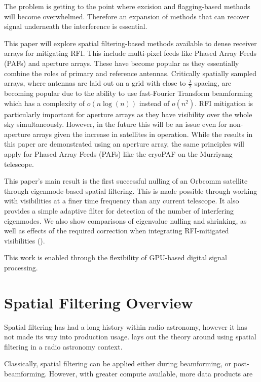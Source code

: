 \documentclass{pas}
\begin{document}
The problem is getting to the point where excision and flagging-based
methods will become overwhelmed. Therefore an expansion of methods 
that can recover signal underneath the interference is essential.

This paper will explore spatial filtering-based methods available to dense
receiver arrays for mitigating RFI. This include multi-pixel feeds like
Phased Array Feeds (PAFs) and aperture arrays. These have become popular as
they essentially combine the roles of primary and reference antennas.
Critically spatially sampled arrays, where antennas are laid out on a grid
with close to $\frac{\lambda}{2}$ spacing, are becoming popular due to the
ability to use fast-Fourier Transform beamforming which has a complexity of
$o(n\log(n))$ instead of $o(n^{2})$. RFI mitigation is
particularly important for aperture arrays as they have visibility over the
whole sky simultaneously. However, in the future this will be an issue even
for non-aperture arrays given the increase in satellites in operation. While
the results in this paper are demonstrated using an aperture array, the same
principles will apply for Phased Array Feeds (PAFs) like the cryoPAF on the
Murriyang telescope.

This paper's main result is the first successful nulling of an Orbcomm satellite
through eigenmode-based spatial filtering. This is made possible through
working with visibilities at a finer time frequency than any current
telescope. It also provides a simple adaptive filter for detection of the
number of interfering eigenmodes. We also show comparisons of eigenvalue
nulling and shrinking, as well as effects of the required correction when
integrating RFI-mitigated visibilities (\cite{leshem_multichannel_2000}).

This work is enabled through the flexibility of GPU-based digital signal
processing. 


\section{Spatial Filtering Overview}
Spatial filtering has had a long history within radio astronomy, however it has 
not made its way into production usage. \cite{leshem_multichannel_2000} lays out 
the theory around using spatial filtering in a radio astronomy context. 

Classically, spatial filtering can be applied either during beamforming, or post-beamforming. 
However, with greater compute available, more data products are 
\end{document}
